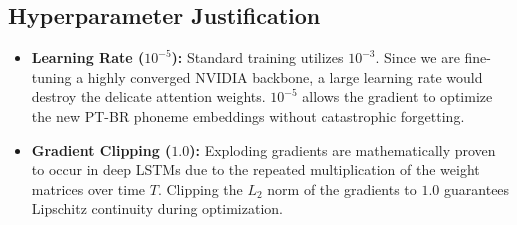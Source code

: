 \documentclass[12pt]{article}
\begin{document}
\subsection{Hyperparameter Justification}
\begin{itemize}
    \item \textbf{Learning Rate ($10^{-5}$):} Standard training utilizes $10^{-3}$. Since we are fine-tuning a highly converged NVIDIA backbone, a large learning rate would destroy the delicate attention weights. $10^{-5}$ allows the gradient to optimize the new PT-BR phoneme embeddings without catastrophic forgetting.
    \item \textbf{Gradient Clipping ($1.0$):} Exploding gradients are mathematically proven to occur in deep LSTMs due to the repeated multiplication of the weight matrices over time $T$. Clipping the $L_2$ norm of the gradients to $1.0$ guarantees Lipschitz continuity during optimization.
\end{itemize}
\end{document}
